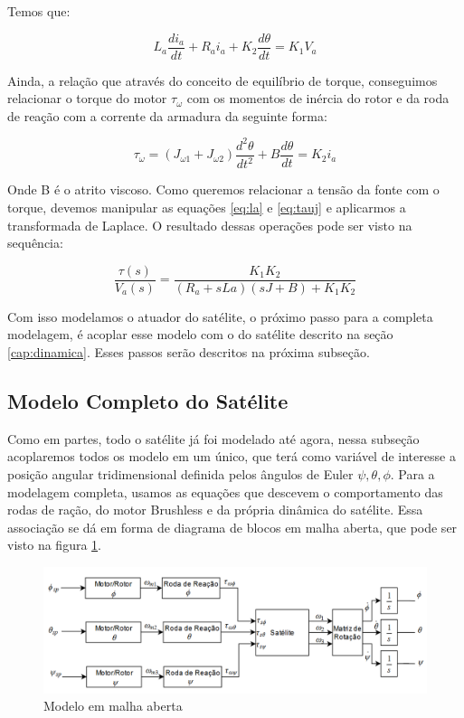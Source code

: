 Temos que:

\begin{equation}\label{eq:la}
L_a \frac{di_a}{dt}+R_a i_a + K_2\frac{d\theta}{dt} = K_1V_a
\end{equation}

Ainda, a relação que através do conceito de equilíbrio de torque, conseguimos relacionar o torque do motor $\tau_{\omega}$ com os momentos de inércia do rotor e da roda de reação com a corrente da armadura da seguinte forma:

\begin{equation}\label{eq:tauj}
\tau_{\omega} = (J_{\omega 1} + J_{\omega 2})\frac{d^{2}\theta}{dt^{2}}+B\frac{d\theta}{dt} = K_2 i_a
\end{equation}

Onde B é o atrito viscoso. Como queremos relacionar a tensão da fonte com o torque, devemos manipular as equações \ref{eq:la} e \ref{eq:tauj} e aplicarmos a transformada de Laplace. O resultado dessas operações pode ser visto na sequência: 

\begin{equation}
  \frac{\tau(s)}{V_a(s)} = \frac{K_1K_2}{(R_a+ sLa)(sJ+B)+K_1K_2}  
\end{equation}

Com isso modelamos o atuador do satélite, o próximo passo para a completa modelagem, é acoplar esse modelo com o do satélite descrito na seção \ref{cap:dinamica}. Esses passos serão descritos na próxima subseção.

\subsection{Modelo Completo do Satélite}

Como em partes, todo o satélite já foi modelado até agora, nessa subseção acoplaremos todos os modelo em um único, que terá como variável de interesse a posição angular tridimensional definida pelos ângulos de Euler $\psi, \theta, \phi$. Para a modelagem completa, usamos as equações que descevem o comportamento das rodas de ração, do motor Brushless e da própria dinâmica do satélite. Essa associação se dá em forma de diagrama de blocos em malha aberta, que pode ser visto na figura \ref{fig:modelo_satelite_malha_aberta}.

\begin{figure}[H]
  \caption{Modelo em malha aberta}
  \begin{center}
      \includegraphics[scale=.55]{img/modelo_satelite_malha_aberta}
  \end{center}
  \label{fig:modelo_satelite_malha_aberta}
\end{figure}

